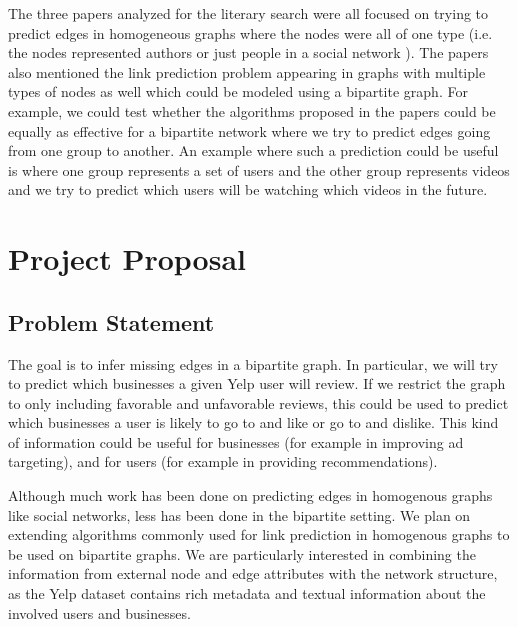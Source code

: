 \documentclass[11pt]{article}
\begin{document}
The three papers analyzed for the literary search were all focused on trying to predict edges in homogeneous graphs where the nodes were all of one type (i.e. the nodes represented authors \cite{nowellklein, backstromjure} or just people in a social network \cite{backstromjure}).  The papers also mentioned the link prediction problem appearing in graphs with multiple types of nodes as well which could be modeled using a bipartite graph.  For example, we could test whether the algorithms proposed in the papers could be equally as effective for a bipartite network where we try to predict edges going from one group to another\cite{bipartite}.  An example where such a prediction could be useful is where one group represents a set of users and the other group represents videos and we try to predict which users will be watching which videos in the future.


\section{Project Proposal}
\subsection{Problem Statement}
The goal is to infer missing edges in a bipartite graph. In particular, we will try to predict which businesses a given Yelp user will review. If we restrict the graph to only including favorable and unfavorable reviews, this could be used to predict which businesses a user is likely to go to and like or go to and dislike. This kind of information could be useful for businesses (for example in improving ad targeting), and for users (for example in providing recommendations). \\
\par Although much work has been done on predicting edges in homogenous graphs like social networks, less has been done in the bipartite setting. We plan on extending algorithms commonly used for link prediction in homogenous graphs to be used on bipartite graphs. We are particularly interested in combining the information from external node and edge attributes with the network structure, as the Yelp dataset contains rich metadata and textual information about the involved users and businesses. 
\end{document}
